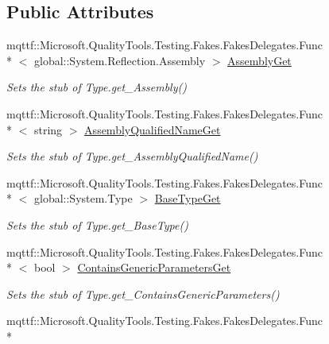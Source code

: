 \subsection*{Public Attributes}
\begin{DoxyCompactItemize}
\item 
mqttf\-::\-Microsoft.\-Quality\-Tools.\-Testing.\-Fakes.\-Fakes\-Delegates.\-Func\\*
$<$ global\-::\-System.\-Reflection.\-Assembly $>$ \hyperlink{class_system_1_1_fakes_1_1_stub_type_a79adc469fcbc232bfd454f01adf768a5}{Assembly\-Get}
\begin{DoxyCompactList}\small\item\em Sets the stub of Type.\-get\-\_\-\-Assembly()\end{DoxyCompactList}\item 
mqttf\-::\-Microsoft.\-Quality\-Tools.\-Testing.\-Fakes.\-Fakes\-Delegates.\-Func\\*
$<$ string $>$ \hyperlink{class_system_1_1_fakes_1_1_stub_type_a80441f82226b0396b33c9c7cffbf0b18}{Assembly\-Qualified\-Name\-Get}
\begin{DoxyCompactList}\small\item\em Sets the stub of Type.\-get\-\_\-\-Assembly\-Qualified\-Name()\end{DoxyCompactList}\item 
mqttf\-::\-Microsoft.\-Quality\-Tools.\-Testing.\-Fakes.\-Fakes\-Delegates.\-Func\\*
$<$ global\-::\-System.\-Type $>$ \hyperlink{class_system_1_1_fakes_1_1_stub_type_a4534c016838343e90e5823c901f2545a}{Base\-Type\-Get}
\begin{DoxyCompactList}\small\item\em Sets the stub of Type.\-get\-\_\-\-Base\-Type()\end{DoxyCompactList}\item 
mqttf\-::\-Microsoft.\-Quality\-Tools.\-Testing.\-Fakes.\-Fakes\-Delegates.\-Func\\*
$<$ bool $>$ \hyperlink{class_system_1_1_fakes_1_1_stub_type_aceb5da953d4c32985ef17f85ce886c98}{Contains\-Generic\-Parameters\-Get}
\begin{DoxyCompactList}\small\item\em Sets the stub of Type.\-get\-\_\-\-Contains\-Generic\-Parameters()\end{DoxyCompactList}\item 
mqttf\-::\-Microsoft.\-Quality\-Tools.\-Testing.\-Fakes.\-Fakes\-Delegates.\-Func\\*

\end{DoxyCompactItemize}
